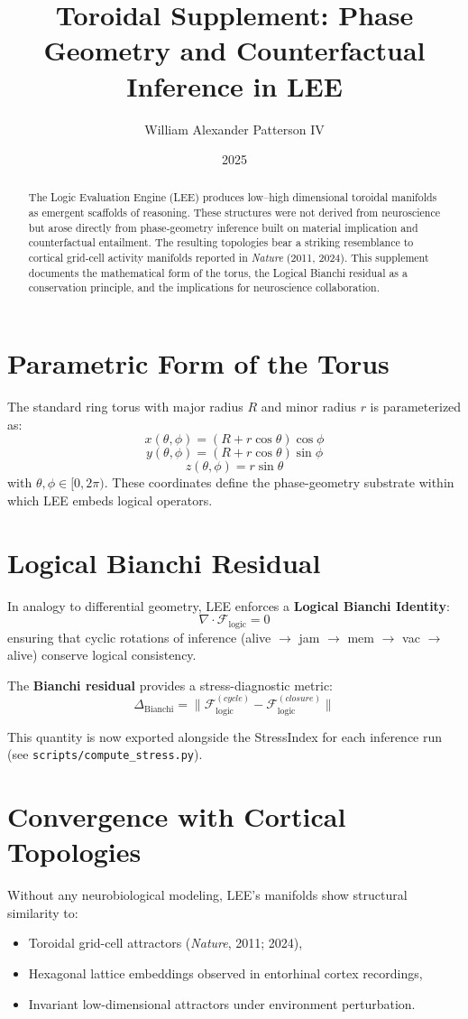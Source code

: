 \documentclass[11pt]{article}
\title{Toroidal Supplement: Phase Geometry and Counterfactual Inference in LEE}
\author{William Alexander Patterson IV}
\date{2025}
\begin{document}
	\maketitle
	
	\begin{abstract}
		The Logic Evaluation Engine (LEE) produces low--high dimensional toroidal manifolds as emergent scaffolds of reasoning. These structures were not derived from neuroscience but arose directly from phase-geometry inference built on material implication and counterfactual entailment. The resulting topologies bear a striking resemblance to cortical grid-cell activity manifolds reported in \textit{Nature} (2011, 2024). This supplement documents the mathematical form of the torus, the Logical Bianchi residual as a conservation principle, and the implications for neuroscience collaboration.
	\end{abstract}
	
	\section{Parametric Form of the Torus}
	The standard ring torus with major radius $R$ and minor radius $r$ is parameterized as:
	\[
	x(\theta,\phi) = (R + r\cos\theta)\cos\phi
	\]
	\[
	y(\theta,\phi) = (R + r\cos\theta)\sin\phi
	\]
	\[
	z(\theta,\phi) = r\sin\theta
	\]
	with $\theta,\phi \in [0,2\pi)$. These coordinates define the phase-geometry substrate within which LEE embeds logical operators.
	
	\section{Logical Bianchi Residual}
	In analogy to differential geometry, LEE enforces a \textbf{Logical Bianchi Identity}:
	\[
	\nabla \cdot \mathcal{F}_{\text{logic}} = 0
	\]
	ensuring that cyclic rotations of inference (alive $\rightarrow$ jam $\rightarrow$ mem $\rightarrow$ vac $\rightarrow$ alive) conserve logical consistency.  
	
	The \textbf{Bianchi residual} provides a stress-diagnostic metric:
	\[
	\Delta_{\text{Bianchi}} = \|\mathcal{F}_{\text{logic}}^{(cycle)} - \mathcal{F}_{\text{logic}}^{(closure)}\|
	\]
	
	This quantity is now exported alongside the StressIndex for each inference run (see \texttt{scripts/compute\_stress.py}).
	
	\section{Convergence with Cortical Topologies}
	Without any neurobiological modeling, LEE’s manifolds show structural similarity to:
	\begin{itemize}
		\item Toroidal grid-cell attractors (\textit{Nature}, 2011; 2024),
		\item Hexagonal lattice embeddings observed in entorhinal cortex recordings,
		\item Invariant low-dimensional attractors under environment perturbation.
	\end{itemize}
	
\end{document}
